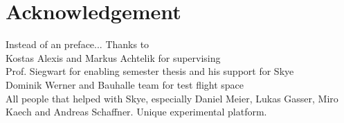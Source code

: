 \section{Acknowledgement}

Instead of an preface...
Thanks to \\
Kostas Alexis and Markus Achtelik for supervising \\
Prof. Siegwart for enabling semester thesis and his support for Skye \\
Dominik Werner and Bauhalle team for test flight space \\
All people that helped with Skye, especially Daniel Meier, Lukas Gasser, Miro Kaech and Andreas Schaffner. Unique experimental platform.